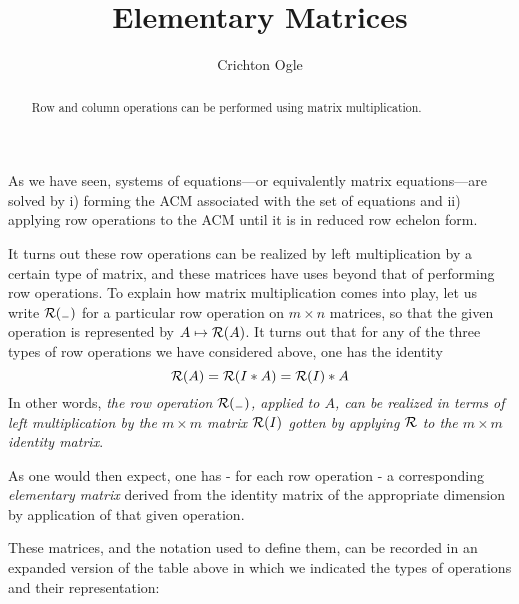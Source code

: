 \documentclass{ximera}
\title{Elementary Matrices}
\author{Crichton Ogle}
\begin{document}
\begin{abstract}
  Row and column operations can be performed using matrix multiplication.
\end{abstract}
\maketitle

As we have seen, systems of equations---or equivalently matrix
equations---are solved by i) forming the ACM associated with the set
of equations and ii) applying row operations to the ACM until it is in
reduced row echelon form.

It turns out these row operations can be realized by left
multiplication by a certain type of matrix, and these matrices have
uses beyond that of performing row operations. To explain how matrix
multiplication comes into play, let us write $\cal R(_-)$ for a
particular row operation on $m\times n$ matrices, so that the given
operation is represented by $A\mapsto {\cal R}(A)$. It turns out that
for any of the three types of row operations we have considered above,
one has the identity
\[
{\cal R}(A) = {\cal R}(I*A) = {\cal R}(I)*A
\]
In other words, {\it the row operation ${\cal R}(_-)$, applied to $A$, can be realized in terms of left multiplication by the $m\times m$ matrix ${\cal R}(I)$ gotten by applying $\cal R$ to the $m\times m$ identity matrix}.

As one would then expect, one has - for each row operation - a
corresponding {\it elementary matrix} derived from the identity matrix
of the appropriate dimension by application of that given operation.

These matrices, and the notation used to define them, can be recorded
in an expanded version of the table above in which we indicated the
types of operations and their representation:
\end{document}

